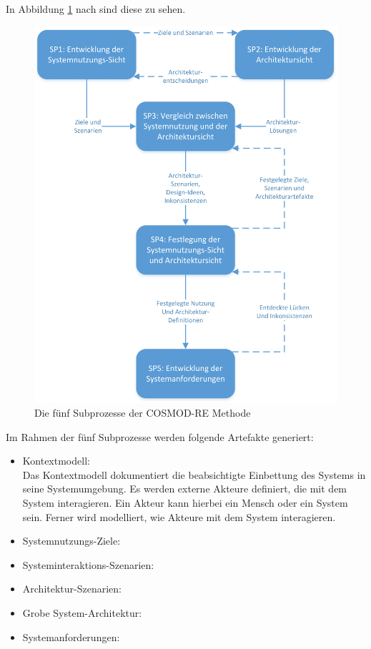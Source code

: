In Abbildung \ref{fig:pro5} nach \cite{pohl} sind diese zu sehen. 

\begin{figure}[h]
	\centering
	\includegraphics[scale=0.65]{COSMODRE5prozesse.jpg} 
	\caption{Die fünf Subprozesse der COSMOD-RE Methode}\label{fig:pro5}
\end{figure}

Im Rahmen der fünf Subprozesse werden folgende Artefakte generiert:\\

\begin{itemize}
\item Kontextmodell:\\
Das Kontextmodell dokumentiert die beabsichtigte Einbettung des Systems in seine Systemumgebung. Es werden externe Akteure definiert, die mit dem System interagieren. Ein Akteur kann hierbei ein Mensch oder ein System sein. Ferner wird modelliert, wie Akteure mit dem System interagieren.
\item Systemnutzungs-Ziele:\\

\item Systeminteraktions-Szenarien:
\item Architektur-Szenarien:
\item Grobe System-Architektur:
\item Systemanforderungen:
\end{itemize}

